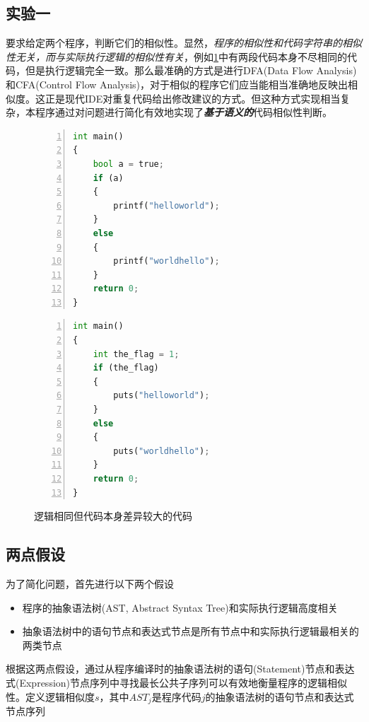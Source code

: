 \documentclass[a4paper,twoside]{article}
\begin{document}
\begin{spacing}{1.2}
\newpage

\section{实验一}

要求给定两个程序，判断它们的相似性。显然，\emph{程序的相似性和代码字符串的相似性无关，而与实际执行逻辑的相似性有关}，例如\ref{fig:dupcode}中有两段代码本身不尽相同的代码，但是执行逻辑完全一致。那么最准确的方式是进行DFA(Data Flow Analysis)和CFA(Control Flow Analysis)，对于相似的程序它们应当能相当准确地反映出相似度。这正是现代IDE对重复代码给出修改建议的方式。但这种方式实现相当复杂，本程序通过对问题进行简化有效地实现了\emph{\textbf{基于语义的}}代码相似性判断。

\begin{figure}[htbp]
\caption{逻辑相同但代码本身差异较大的代码}
\label{fig:dupcode}
\begin{minipage}{0.48\textwidth}
\begin{lstlisting}[language=Python,numbers=left,style=PythonStyle,label={code:dupexample1}]
int main()
{
	bool a = true;
	if (a)
	{
		printf("helloworld");
	}
	else
	{
		printf("worldhello");
	}
	return 0;
}
\end{lstlisting}
\end{minipage}
\begin{minipage}{0.48\textwidth}
\begin{lstlisting}[language=Python,numbers=left,style=PythonStyle,label={code:dupexample2}]
int main()
{
	int the_flag = 1;
	if (the_flag)
	{
		puts("helloworld");
	}
	else
	{
		puts("worldhello");
	}
	return 0;
}
\end{lstlisting}
\end{minipage}
\end{figure}

\subsection{两点假设}
为了简化问题，首先进行以下两个假设

\begin{itemize}
	\item 程序的抽象语法树(AST, Abstract Syntax Tree)和实际执行逻辑高度相关
	\item 抽象语法树中的语句节点和表达式节点是所有节点中和实际执行逻辑最相关的两类节点
\end{itemize}

根据这两点假设，通过从程序编译时的抽象语法树的语句(Statement)节点和表达式(Expression)节点序列中寻找最长公共子序列可以有效地衡量程序的逻辑相似性。定义逻辑相似度$s$，其中$AST_j$是程序代码$j$的抽象语法树的语句节点和表达式节点序列


\end{spacing}
\end{document}
